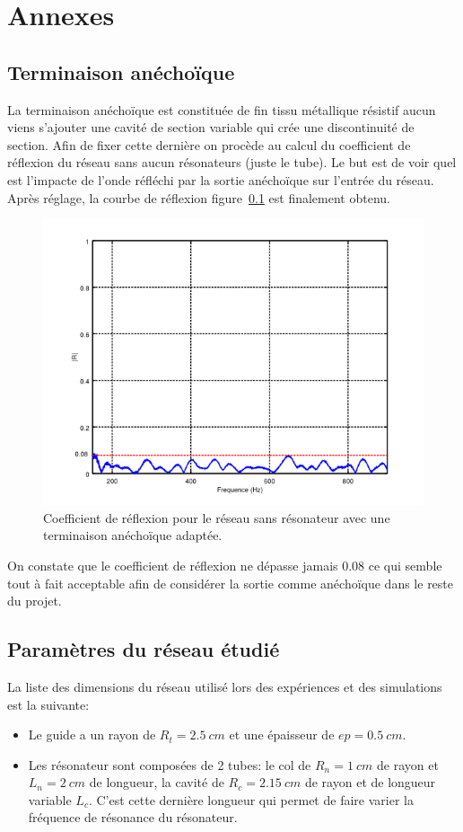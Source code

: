 \chapter*{Annexes}

\section{Terminaison anéchoïque}
\label{term_anecho}
La terminaison anéchoïque est constituée de fin tissu métallique résistif aucun viens s'ajouter une cavité de section variable qui crée une discontinuité de section. Afin de fixer cette dernière on procède au calcul du coefficient de réflexion du réseau sans aucun résonateurs (juste le tube). Le but est de voir quel est l'impacte de l'onde réfléchi par la sortie anéchoïque sur l'entrée du réseau. Après réglage, la courbe de réflexion figure~\ref{fig_term_anecho} est finalement obtenu.

\begin{figure}
\centering
\includegraphics[scale=0.5]{./images_annexe/anecho.png}
\caption{\label{fig_term_anecho} Coefficient de réflexion pour le réseau sans résonateur avec une terminaison anéchoïque adaptée.}
\end{figure}

On constate que le coefficient de réflexion ne dépasse jamais 0.08 ce qui semble tout à fait acceptable afin de considérer la sortie comme anéchoïque dans le reste du projet.

\section{Paramètres du réseau étudié}
\label{annexe_corr}
La liste des dimensions du réseau utilisé lors des expériences et des simulations est la suivante:
\begin{itemize}
\item Le guide a un rayon de $R_t = 2.5~cm$ et une épaisseur de $ep = 0.5~cm$.
\item Les résonateur sont composées de 2 tubes: le col de $R_n = 1~cm$ de rayon et $L_n = 2~cm$ de longueur, la cavité de $R_c = 2.15~cm$ de rayon et de longueur variable $L_c$. C'est cette dernière longueur qui permet de faire varier la fréquence de résonance du résonateur. 
\end{itemize}

